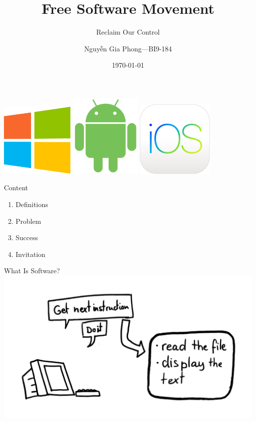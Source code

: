 \documentclass[pdf]{beamer}
\title{Free Software Movement}
\subtitle{Reclaim Our Control}
\author{Nguyễn Gia Phong---BI9-184}
\date{\selectlanguage{english}\today}
\begin{document}
\begin{frame}
  \pause
  \includegraphics[width=0.27\textwidth]{Windows.png}
  \pause\hfill
  \includegraphics[width=0.26\textwidth]{Android.png}
  \pause\hfill
  \includegraphics[width=0.28\textwidth]{iOS.png}
\end{frame}

\begin{frame}
  \titlepage
\end{frame}

\begin{frame}{Content}
  \Large
  \begin{enumerate}
    \item Definitions
    \item Problem
    \item Success
    \item Invitation
  \end{enumerate}
\end{frame}

\begin{frame}{What Is Software?}
  \includegraphics[width=\textwidth]{software-def.png}
\end{frame}
\end{document}
